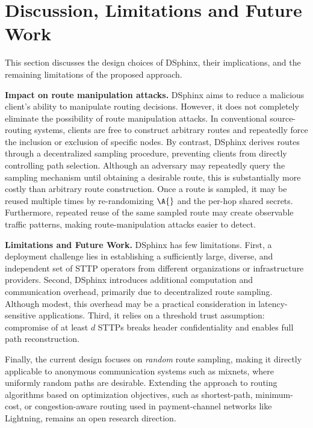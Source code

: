 \section{Discussion, Limitations and Future Work}

This section discusses the design choices of DSphinx, their implications, and the remaining limitations of the proposed approach.

\smallskip
\noindent\textbf{Impact on route manipulation attacks.}
DSphinx aims to reduce a malicious client's ability to manipulate routing decisions. 
However, it does not completely eliminate the possibility of route manipulation attacks.
In conventional source-routing systems, clients are free to construct arbitrary routes and repeatedly force the inclusion or exclusion of specific nodes.
By contrast, DSphinx derives routes through a decentralized sampling procedure, preventing clients from directly controlling path selection. 
Although an adversary may repeatedly query the sampling mechanism until obtaining a desirable route, this is substantially more costly than arbitrary route construction.
Once a route is sampled, it may be reused multiple times by re-randomizing $\A{}$ and the per-hop shared secrets. 
Furthermore, repeated reuse of the same sampled route may create observable traffic patterns, making route-manipulation attacks easier to detect.

\smallskip
\noindent\textbf{Limitations and Future Work.}
DSphinx has few limitations. 
First, a deployment challenge lies in establishing a sufficiently large, diverse, and independent set of STTP operators from different organizations or infrastructure providers.
Second, DSphinx introduces additional computation and communication overhead, primarily due to decentralized route sampling. 
Although modest, this overhead may be a practical consideration in latency-sensitive applications.
Third, it relies on a threshold trust assumption: compromise of at least $d$ STTPs breaks header confidentiality and enables full path reconstruction.

Finally, the current design focuses on \emph{random} route sampling, making it directly applicable to anonymous communication systems such as mixnets, where uniformly random paths are desirable. 
Extending the approach to routing algorithms based on optimization objectives, such as shortest-path, minimum-cost, or congestion-aware routing used in payment-channel networks like Lightning, remains an open research direction.
